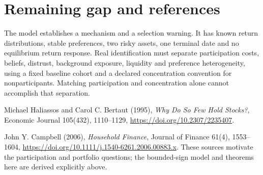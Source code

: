 \documentclass[11pt,a4paper]{article}
\theoremstyle{definition}
\theoremstyle{remark}
\begin{document}
\section{Remaining gap and references}
The model establishes a mechanism and a selection warning. It has known return distributions, stable preferences, two risky assets, one terminal date and no equilibrium return response. Real identification must separate participation costs, beliefs, distrust, background exposure, liquidity and preference heterogeneity, using a fixed baseline cohort and a declared concentration convention for nonparticipants. Matching participation and concentration alone cannot accomplish that separation.

Michael Haliassos and Carol C. Bertaut (1995), \emph{Why Do So Few Hold Stocks?}, Economic Journal 105(432), 1110--1129, \url{https://doi.org/10.2307/2235407}.

John Y. Campbell (2006), \emph{Household Finance}, Journal of Finance 61(4), 1553--1604, \url{https://doi.org/10.1111/j.1540-6261.2006.00883.x}. These sources motivate the participation and portfolio questions; the bounded-sign model and theorems here are derived explicitly above.
\end{document}
